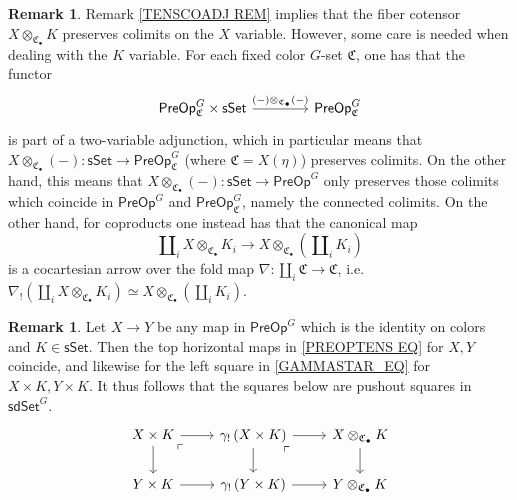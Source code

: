 \documentclass[a4paper,10pt
,draft
]{article}%
\numberwithin{equation}{section}
\numberwithin{figure}{section}
\theoremstyle{definition} %
\newtheorem{remark}[equation]{Remark}%
\newcommand{\1}{\ensuremath{\mathbbm 1}}%
\begin{document}
\begin{remark}\label{NOTTWOVARADJ REM}
	Remark \ref{TENSCOADJ REM} implies that the fiber cotensor
	$X \otimes_{\mathfrak{C}_{\bullet}} K$
	preserves colimits on the $X$ variable.
	However, some care is needed when dealing with the 
	$K$ variable.
	For each fixed color $G$-set $\mathfrak{C}$, one has that the functor
\[
\begin{tikzcd}[row sep = 0, column sep = 40pt]
	\mathsf{PreOp}^G_{\mathfrak{C}} \times \mathsf{sSet} \ar{r}{(-)\otimes_{\mathfrak{C}_{\bullet}}(-)} 
&
	\mathsf{PreOp}^G_{\mathfrak{C}}
\end{tikzcd}
\]
is part of a two-variable adjunction,
which in particular means that
$X \otimes_{\mathfrak{C}_{\bullet}} (-) \colon 
\mathsf{sSet} \to \mathsf{PreOp}^G_{\mathfrak{C}}$ 
(where $\mathfrak{C}=X(\eta)$)
preserves colimits.
On the other hand, this means that
$X \otimes_{\mathfrak{C}_{\bullet}} (-) \colon
\mathsf{sSet} \to \mathsf{PreOp}^G$
only preserves those colimits which coincide in
$\mathsf{PreOp}^G$ and $\mathsf{PreOp}^G_{\mathfrak{C}}$,
namely the connected colimits.
%
On the other hand, for coproducts one instead has that the canonical map
\[
\amalg_i X \otimes_{\mathfrak{C}_{\bullet}} K_i
	\to
X \otimes_{\mathfrak{C}_{\bullet}} (\amalg_i K_i)
\]
is a cocartesian arrow over the fold map
$\nabla \colon 
\amalg_i \mathfrak{C} \to \mathfrak{C}$, 
i.e.
$
\nabla_!
\left(\amalg_i X \otimes_{\mathfrak{C}_{\bullet}} K_i\right)
\simeq
X \otimes_{\mathfrak{C}_{\bullet}} (\amalg_i K_i)
$.
\end{remark}



\begin{remark}\label{COLORTENSGAM REM}
	Let $X \to Y$ be any map in $\mathsf{PreOp}^G$
	which is the identity on colors and 
	$K \in \mathsf{sSet}$. 
	Then the top horizontal maps in \eqref{PREOPTENS EQ}
	for $X,Y$ coincide, 
	and likewise for the 
	left square in \eqref{GAMMASTAR_EQ} for
	$X \times K, Y \times K$.
%
	It thus follows that the squares below are pushout squares in $\mathsf{sdSet}^G$.
\[
\begin{tikzcd}
	X \times K \ar{r} \ar{d} 
	\arrow[dr, phantom, "\ulcorner", very near start] 
&
	\gamma_! \left( X \times K \right) \ar{r} \ar{d} 
	\arrow[dr, phantom, "\ulcorner", very near start] 
&
	X \otimes_{\mathfrak{C}_{\bullet}} K \ar{d}
\\
	Y \times K \ar{r} 
&
	\gamma_! \left( Y \times K \right) \ar{r} 
&
	Y \otimes_{\mathfrak{C}_{\bullet}} K
\end{tikzcd}
\]
\end{remark}
\end{document}
